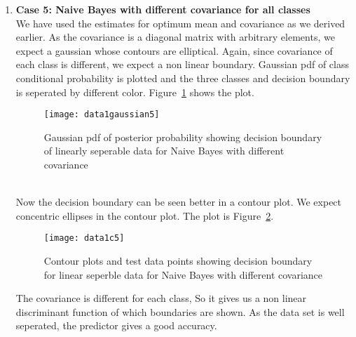 \documentclass[11pt,paper=a4,answers]{exam}
\begin{document}
\begin{questions}
\begin{enumerate}[i.]
\begin{enumerate}
            \item \textbf{Case 5: Naive Bayes with different covariance for all classes}\\
            We have used the estimates for optimum mean and covariance as we derived earlier. As the covariance is a diagonal matrix with arbitrary elements, we expect a gaussian whose contours are elliptical. Again, since covariance of each class is different, we expect a non linear boundary. Gaussian pdf of class conditional probability is plotted and the three classes and decision boundary is seperated by different color. Figure~\ref{fig:data1g5} shows the plot.
            \begin{figure}[ht]
                \centering
                \texttt{[image: data1gaussian5]}
                \vspace{-30pt}
                \caption{Gaussian pdf of posterior probability showing decision boundary of linearly seperable data for Naive Bayes with different covariance}
                \label{fig:data1g5}
            \end{figure}\\
            Now the decision boundary can be seen better in a contour plot. We expect concentric ellipses in the contour plot. The plot is Figure~\ref{fig:data1c5}.\\ 
            \begin{figure}[ht]
                \centering
                \texttt{[image: data1c5]}
                \vspace{-30pt}
                \caption{Contour plots and test data points showing decision boundary for linear seperble data for Naive Bayes with different covariance}
                \label{fig:data1c5}
            \end{figure}
            The covariance is different for each class, So it gives us a non linear discriminant function of which boundaries are shown. As the data set is well seperated, the predictor gives a good accuracy.
        \end{enumerate}


\end{enumerate}
\end{questions}
\end{document}
